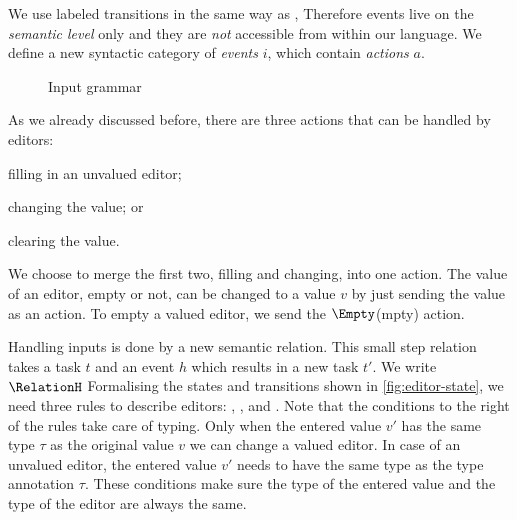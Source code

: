 %
We use labeled transitions in the same way as \textcite{school/maktoberdorf/PeytonJones01},
Therefore events live on the \emph{semantic level} only
and they are \emph{not} accessible from within our language.
We define a new syntactic category of \emph{events} $i$,
which contain \emph{actions} $a$.

\begin{figure}[h]
  \small
  \caption{Input grammar} \label{fig:input-grammar}
\end{figure}

As we already discussed before,
there are three actions that can be handled by editors:
\begin{enumerate*}
  \item filling in an unvalued editor;
  \item changing the value; or
  \item clearing the value.
\end{enumerate*}
We choose to merge the first two, filling and changing, into one action.
The value of an editor, empty or not, can be changed to a value $v$ by just sending the value as an action.
To empty a valued editor, we send the $\Empty$(mpty) action.

Handling inputs is done by a new semantic relation.
This small step relation takes a task $t$ and an event $h$ which results in a new task $t'$.
We write $\RelationH$
Formalising the states and transitions shown in \cref{fig:editor-state},
we need three rules to describe editors:
, , and .
Note that the conditions to the right of the rules take care of typing.
Only when the entered value $v'$ has the same type $\tau$ as the original value $v$ we can change a valued editor.
In case of an unvalued editor,
the entered value $v'$ needs to have the same type as the type annotation $\tau$.
These conditions make sure the type of the entered value and the type of the editor are always the same.

